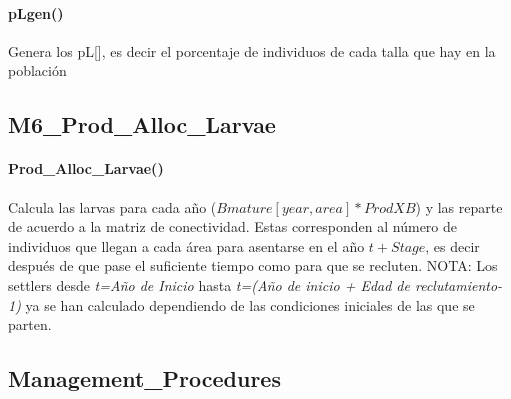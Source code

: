 \documentclass[12pt, oneside, a4paper]{article}
\begin{document}
			\paragraph{pLgen()}
				Genera los pL[], es decir el porcentaje de individuos de cada talla que hay en la población
		\subsection{M6\_Prod\_Alloc\_Larvae}
			\paragraph{Prod\_Alloc\_Larvae()}
				Calcula las larvas para cada año ($Bmature[year, area]* ProdXB$) y las reparte de acuerdo a la matriz de conectividad. Estas corresponden al número de individuos que llegan a cada área para asentarse en el año $t+Stage$, es decir después de que pase el suficiente tiempo como para que se recluten.  
				NOTA: Los settlers desde \emph{t=Año de Inicio} hasta \emph{t=(Año de inicio + Edad de reclutamiento-1)} ya se han calculado dependiendo de las condiciones iniciales de las que se parten. 
		\subsection{Management\_Procedures}
\end{document}
